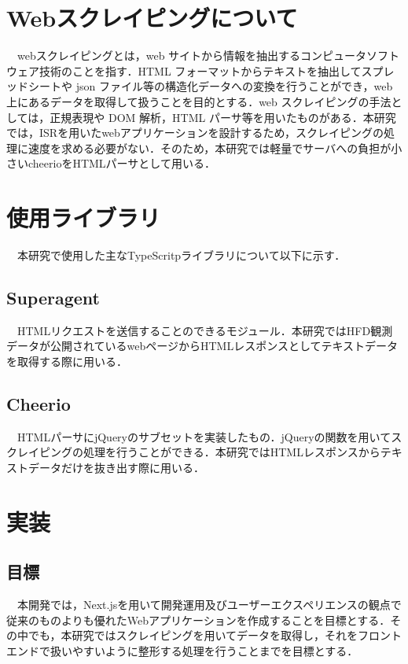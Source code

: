 \section{Webスクレイピングについて}

　webスクレイピングとは，web サイトから情報を抽出するコンピュータソフトウェア技術のことを指す．HTML フォーマットからテキストを抽出してスプレッドシートや json ファイル等の構造化データへの変換を行うことができ，web 上にあるデータを取得して扱うことを目的とする．web スクレイピングの手法としては，正規表現や DOM 解析，HTML パーサ等を用いたものがある．本研究では，ISRを用いたwebアプリケーションを設計するため，スクレイピングの処理に速度を求める必要がない．そのため，本研究では軽量でサーバへの負担が小さいcheerioをHTMLパーサとして用いる．
\section{使用ライブラリ}
　本研究で使用した主なTypeScritpライブラリについて以下に示す．
\subsection{Superagent}

　HTMLリクエストを送信することのできるモジュール．本研究ではHFD観測データが公開されているwebページからHTMLレスポンスとしてテキストデータを取得する際に用いる．\cite{superagent}
\subsection{Cheerio}

　HTMLパーサにjQueryのサブセットを実装したもの．jQueryの関数を用いてスクレイピングの処理を行うことができる．本研究ではHTMLレスポンスからテキストデータだけを抜き出す際に用いる．\cite{cheerio}
\section{実装}
\subsection{目標}
　本開発では，Next.jsを用いて開発運用及びユーザーエクスペリエンスの観点で従来のものよりも優れたWebアプリケーションを作成することを目標とする．その中でも，本研究ではスクレイピングを用いてデータを取得し，それをフロントエンドで扱いやすいように整形する処理を行うことまでを目標とする．
